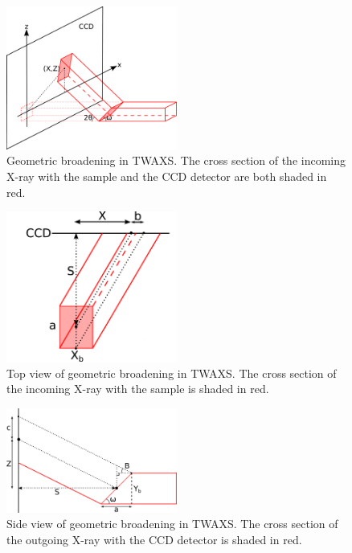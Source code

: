 \begin{figure}[htbp]
  \centering
  \includegraphics[width=0.5\textwidth]{figures/ripple/transmission/geometric_broadening1}
  \caption{Geometric broadening in TWAXS. The cross section of the incoming X-ray 
  with the sample and the CCD detector are both shaded in red.}
\end{figure}

\begin{figure}[htbp]
  \centering
  \includegraphics[width=0.5\textwidth]{figures/ripple/transmission/geometric_broadening2}
  \caption{Top view of geometric broadening in TWAXS. The cross section of the incoming X-ray 
  with the sample is shaded in red.}
\end{figure}

\begin{figure}[htbp]
  \centering
  \includegraphics[width=0.5\textwidth]{figures/ripple/transmission/geometric_broadening3}
  \caption{Side view of geometric broadening in TWAXS. The cross section of the outgoing X-ray 
  with the CCD detector is shaded in red.}
\end{figure}

